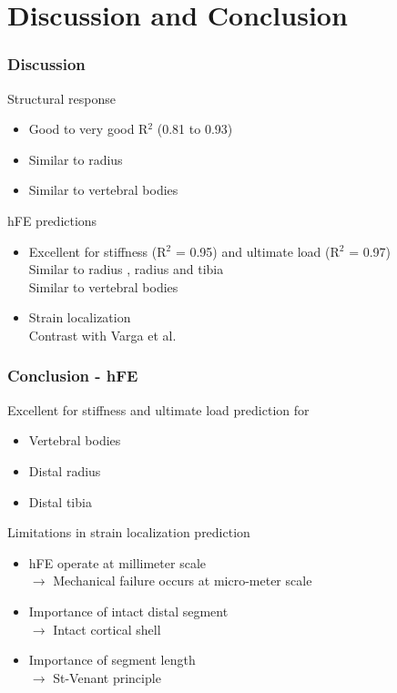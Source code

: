 \documentclass[xcolor=table,11pt]{beamer}
\begin{document}
	
	\section{Discussion and Conclusion}

	\begin{frame}
		\frametitle{Discussion}

		Structural response
		\begin{itemize}
			\item Good to very good R$^2$ (0.81 to 0.93)
			\item Similar to radius \cite{p8}\cite{p9}
			\item Similar to vertebral bodies \cite{p10}\cite{p11}
		\end{itemize}

		\vfill

		hFE predictions
		\begin{itemize}
			\item Excellent for stiffness (R$^2$ = 0.95) and ultimate load (R$^2$ = 0.97)\\Similar to radius \cite{p9}, radius and tibia \cite{p13}\\Similar to vertebral bodies \cite{p10}
			\item Strain localization\\Contrast with Varga et al. \cite{p7}
		\end{itemize}

	\end{frame}
	
	\begin{frame}
		\frametitle{Conclusion - hFE}
		Excellent for stiffness and ultimate load prediction for
		\begin{itemize}
			\item Vertebral bodies
			\item Distal radius
			\item Distal tibia
		\end{itemize}
		
		\vspace{5mm}

		Limitations in strain localization prediction
		\begin{itemize}
			\item hFE operate at millimeter scale\\$\rightarrow$ Mechanical failure occurs at micro-meter scale
			\item Importance of intact distal segment\\$\rightarrow$ Intact cortical shell
			\item Importance of segment length\\$\rightarrow$ St-Venant principle
		\end{itemize}

	\end{frame}
	
\end{document}
